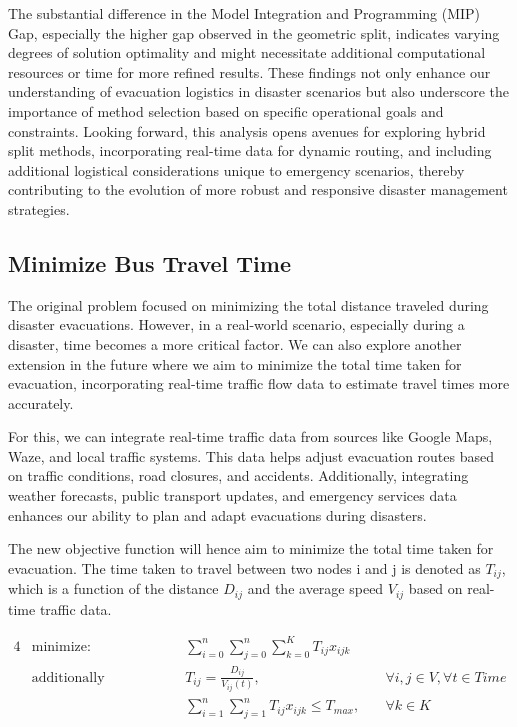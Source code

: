 \documentclass[12pt]{article}
\begin{document}
The substantial difference in the Model Integration and Programming (MIP) Gap, especially the higher gap observed in the geometric split, indicates varying degrees of solution optimality and might necessitate additional computational resources or time for more refined results. These findings not only enhance our understanding of evacuation logistics in disaster scenarios but also underscore the importance of method selection based on specific operational goals and constraints. Looking forward, this analysis opens avenues for exploring hybrid split methods, incorporating real-time data for dynamic routing, and including additional logistical considerations unique to emergency scenarios, thereby contributing to the evolution of more robust and responsive disaster management strategies.

\subsection{Minimize Bus Travel Time}

The original problem focused on minimizing the total distance traveled during disaster evacuations. However, in a real-world scenario, especially during a disaster, time becomes a more critical factor. We can also explore another extension in the future where we aim to minimize the total time taken for evacuation, incorporating real-time traffic flow data to estimate travel times more accurately.

For this, we can integrate real-time traffic data from sources like Google Maps, Waze, and local traffic systems. This data helps adjust evacuation routes based on traffic conditions, road closures, and accidents. Additionally, integrating weather forecasts, public transport updates, and emergency services data enhances our ability to plan and adapt evacuations during disasters.

The new objective function will hence aim to minimize the total time taken for evacuation. The time taken to travel between two nodes i and j is denoted as $T_{ij}$, which is a function of the distance $D_{ij}$ and the average speed $V_{ij}$ based on real-time traffic data.

\begin{alignat}{4}
     & \text{minimize:}                &       & \sum_{i=0}^{n} \sum_{j=0}^{n} \sum_{k=0}^{K} T_{ij} x_{ijk}                                               \\
     & \text{additionally subject to:} & \quad & T_{ij} = \frac{D_{ij}}{V_{ij}(t)},                          & \quad \forall i,j \in V, \forall t \in Time \\
     &                                 & \quad & \sum_{i=1}^{n} \sum_{j=1}^{n} T_{ij} x_{ijk} \leq T_{max},  & \quad \forall k \in K
\end{alignat}
\end{document}
